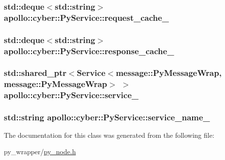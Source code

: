 \hypertarget{classapollo_1_1cyber_1_1PyService_ae4e009d900897119b74006f69c9218ba}{
\subsubsection[{request\-\_\-cache\-\_\-}]{\setlength{\rightskip}{0pt plus 5cm}std\-::deque$<$std\-::string$>$ apollo\-::cyber\-::\-Py\-Service\-::request\-\_\-cache\-\_\-\hspace{0.3cm}{\ttfamily [private]}}}\label{classapollo_1_1cyber_1_1PyService_ae4e009d900897119b74006f69c9218ba}
\hypertarget{classapollo_1_1cyber_1_1PyService_aaca305c91e61517f7e86ad84372091fd}{
\subsubsection[{response\-\_\-cache\-\_\-}]{\setlength{\rightskip}{0pt plus 5cm}std\-::deque$<$std\-::string$>$ apollo\-::cyber\-::\-Py\-Service\-::response\-\_\-cache\-\_\-\hspace{0.3cm}{\ttfamily [private]}}}\label{classapollo_1_1cyber_1_1PyService_aaca305c91e61517f7e86ad84372091fd}
\hypertarget{classapollo_1_1cyber_1_1PyService_a99aaf93ea49699319a639b7e4d5bcb47}{
\subsubsection[{service\-\_\-}]{\setlength{\rightskip}{0pt plus 5cm}std\-::shared\-\_\-ptr$<${\bf Service}$<${\bf message\-::\-Py\-Message\-Wrap}, {\bf message\-::\-Py\-Message\-Wrap}$>$ $>$ apollo\-::cyber\-::\-Py\-Service\-::service\-\_\-\hspace{0.3cm}{\ttfamily [private]}}}\label{classapollo_1_1cyber_1_1PyService_a99aaf93ea49699319a639b7e4d5bcb47}
\hypertarget{classapollo_1_1cyber_1_1PyService_a18608cb4dd8e78999a545a50ba031ebf}{
\subsubsection[{service\-\_\-name\-\_\-}]{\setlength{\rightskip}{0pt plus 5cm}std\-::string apollo\-::cyber\-::\-Py\-Service\-::service\-\_\-name\-\_\-\hspace{0.3cm}{\ttfamily [private]}}}\label{classapollo_1_1cyber_1_1PyService_a18608cb4dd8e78999a545a50ba031ebf}


The documentation for this class was generated from the following file\-:\begin{DoxyCompactItemize}
\item 
py\-\_\-wrapper/\hyperlink{py__node_8h}{py\-\_\-node.\-h}\end{DoxyCompactItemize}
